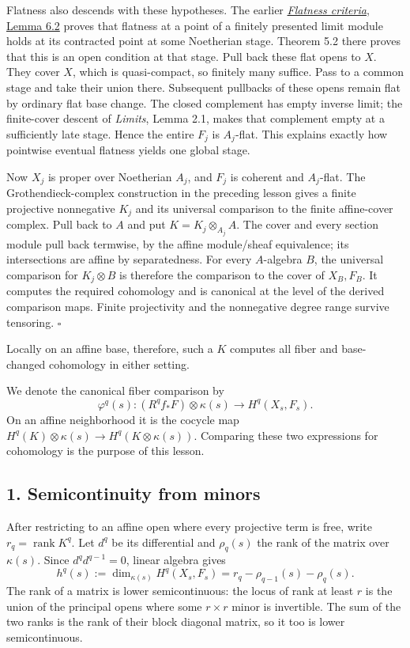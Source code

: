 \documentclass[11pt]{article}
\begin{document}
Flatness also descends with these hypotheses. The earlier
\href{../AG-FSE/AG-FSE-02.html\#6-finite-presentations-over-an-arbitrary-base}{\emph{Flatness
criteria}, Lemma 6.2} proves that flatness at a point of a finitely
presented limit module holds at its contracted point at some Noetherian
stage. Theorem 5.2 there proves that this is an open condition at that
stage. Pull back these flat opens to \(X\). They cover \(X\), which is
quasi-compact, so finitely many suffice. Pass to a common stage and take
their union there. Subsequent pullbacks of these opens remain flat by
ordinary flat base change. The closed complement has empty inverse
limit; the finite-cover descent of \emph{Limits}, Lemma 2.1, makes that
complement empty at a sufficiently late stage. Hence the entire \(F_j\)
is \(A_j\)-flat. This explains exactly how pointwise eventual flatness
yields one global stage.

Now \(X_j\) is proper over Noetherian \(A_j\), and \(F_j\) is coherent
and \(A_j\)-flat. The Grothendieck-complex construction in the preceding
lesson gives a finite projective nonnegative \(K_j\) and its universal
comparison to the finite affine-cover complex. Pull back to \(A\) and
put \(K=K_j\otimes_{A_j}A\). The cover and every section module pull
back termwise, by the affine module/sheaf equivalence; its intersections
are affine by separatedness. For every \(A\)-algebra \(B\), the
universal comparison for \(K_j\otimes B\) is therefore the comparison to
the cover of \(X_B,F_B\). It computes the required cohomology and is
canonical at the level of the derived comparison maps. Finite
projectivity and the nonnegative degree range survive tensoring.
\(\square\)

Locally on an affine base, therefore, such a \(K\) computes all fiber
and base-changed cohomology in either setting.

We denote the canonical fiber comparison by \[
\varphi^q(s):(R^qf_*F)\otimes\kappa(s)\longrightarrow H^q(X_s,F_s).
\] On an affine neighborhood it is the cocycle map
\(H^q(K)\otimes\kappa(s)\to H^q(K\otimes\kappa(s))\). Comparing these
two expressions for cohomology is the purpose of this lesson.

\subsection{1. Semicontinuity from
minors}\label{semicontinuity-from-minors}

After restricting to an affine open where every projective term is free,
write \(r_q=\operatorname{rank}K^q\). Let \(d^q\) be its differential
and \(\rho_q(s)\) the rank of the matrix over \(\kappa(s)\). Since
\(d^qd^{q-1}=0\), linear algebra gives \[
h^q(s):=\dim_{\kappa(s)}H^q(X_s,F_s)
=r_q-\rho_{q-1}(s)-\rho_q(s).
\] The rank of a matrix is lower semicontinuous: the locus of rank at
least \(r\) is the union of the principal opens where some \(r\times r\)
minor is invertible. The sum of the two ranks is the rank of their block
diagonal matrix, so it too is lower semicontinuous.
\end{document}
